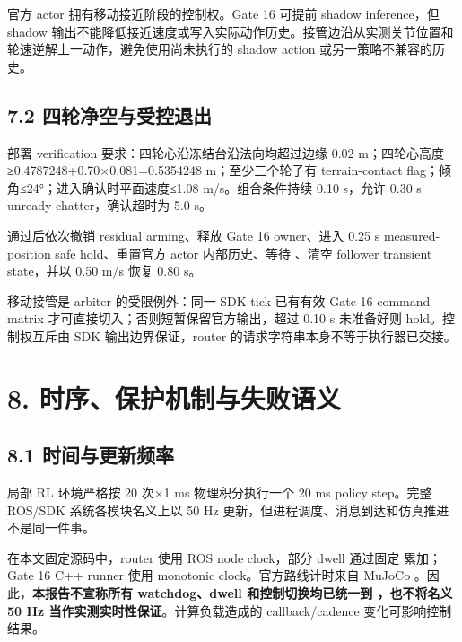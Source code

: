 \documentclass[
  10pt,
  a4paper,
]{article}
\begin{document}
官方 actor 拥有移动接近阶段的控制权。Gate 16 可提前 shadow inference，但
shadow
输出不能降低接近速度或写入实际动作历史。接管边沿从实测关节位置和轮速逆解上一动作，避免使用尚未执行的
shadow action 或另一策略不兼容的历史。

\subsection{7.2
四轮净空与受控退出}\label{ux56dbux8f6eux51c0ux7a7aux4e0eux53d7ux63a7ux9000ux51fa}

部署 verification 要求：四轮心沿冻结台沿法向均超过边缘 0.02
m；四轮心高度≥0.4787248+0.70×0.081=0.5354248 m；至少三个轮子有
terrain-contact flag；倾角≤24°；进入确认时平面速度≤1.08
m/s。组合条件持续 0.10 s，允许 0.30 s unready chatter，确认超时为 5.0
s。

通过后依次撤销 residual arming、释放 Gate 16 owner、进入 0.25 s
measured-position safe hold、重置官方 actor 内部历史、等待
{\ttfamily\small{}}、清空 follower
transient state，并以 0.50 m/s 恢复 0.80 s。

移动接管是 arbiter 的受限例外：同一 SDK tick 已有有效 Gate 16 command
matrix 才可直接切入；否则短暂保留官方输出，超过 0.10 s 未准备好则
hold。控制权互斥由 SDK 输出边界保证，router
的请求字符串本身不等于执行器已交接。

\FloatBarrier

\section{8.
时序、保护机制与失败语义}\label{ux65f6ux5e8fux4fddux62a4ux673aux5236ux4e0eux5931ux8d25ux8bedux4e49}

\subsection{8.1
时间与更新频率}\label{ux65f6ux95f4ux4e0eux66f4ux65b0ux9891ux7387}

局部 RL 环境严格按 20 次×1 ms 物理积分执行一个 20 ms policy step。完整
ROS/SDK 系统各模块名义上以 50 Hz
更新，但进程调度、消息到达和仿真推进不是同一件事。

在本文固定源码中，router 使用 ROS node clock，部分 dwell 通过固定
{\ttfamily\small{}} 累加；Gate 16 C++ runner
使用 monotonic clock。官方路线计时来自 MuJoCo
{\ttfamily\small{}}。因此，\textbf{本报告不宣称所有
watchdog、dwell 和控制切换均已统一到
{\ttfamily\small{}}，也不将名义 50 Hz
当作实测实时性保证}。计算负载造成的 callback/cadence
变化可影响控制结果。
\end{document}
